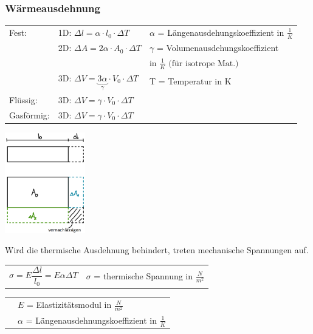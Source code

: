 	\subsubsection{Wärmeausdehnung}
		\begin{minipage}{14cm}
			\newline
				\begin{tabular}{ p{1.5cm} p{4.5cm} | p{7.5cm} }
					Fest:
					& 1D: $\Delta l = \alpha \cdot l_0 \cdot \Delta T $
						& $\alpha$ = Längenausdehungskoeffizient in $\frac{1}{K}$\\
					& 2D: $\Delta A = 2\alpha \cdot A_0 \cdot \Delta T$
						& $\gamma$ = Volumenausdehungskoeffizient\\
						&& \quad \quad in $\frac{1}{K} \text{ (für isotrope Mat.)}$\\
					& 3D: $\Delta V = \underbrace{3\alpha}_{\gamma} \cdot V_0 \cdot \Delta T$
						& T = Temperatur in K\\
					Flüssig:
					& 3D: $\Delta V = \gamma \cdot V_0 \cdot \Delta T$\\
					Gasförmig:
						& 3D: $\Delta V = \gamma \cdot V_0 \cdot \Delta T$\\
				\end{tabular} 
		\end{minipage}
		\begin{minipage}{10cm}
			\includegraphics[width=3.5cm]{./bilder/Waermeausdehnung.png}
		\end{minipage}
		\begin{minipage}[t]{13cm}
			\begin{flushleft}
				Wird die thermische Ausdehnung behindert, treten mechanische Spannungen auf.
			\end{flushleft}
			\renewcommand{\arraystretch}{2.5}
			\begin{tabular}{ p{4cm} | p{7cm}}
				$\sigma = E \dfrac{\Delta l}{l_0} = E \alpha \Delta T$	&	$\sigma$ = thermische Spannung in $\frac{N}{m^2}$\\
			\end{tabular}
			\renewcommand{\arraystretch}{1.5}
			\begin{tabular}{ p{4cm} | p{7cm} }
				& $E$ = Elastizitätsmodul in $\frac{N}{m^2}$\\
				& $\alpha$ = Längenausdehnungskoeffizient in $\frac{1}{K}$\\
			\end{tabular} 
			\renewcommand{\arraystretch}{1}
		\end{minipage}

